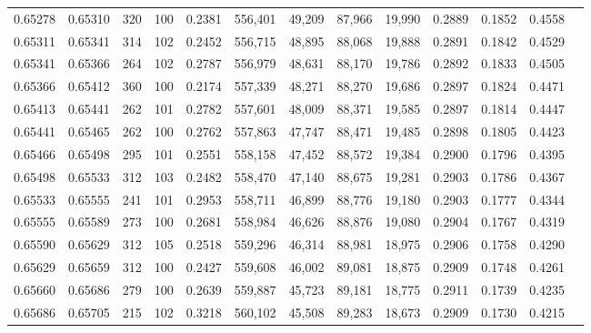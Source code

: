 \begin{tabular}{rrrrrrrrrrrrr}
0.65278 & 0.65310 &   320 & 100 &                                     0.2381 & 556,401 &  49,209 &  87,966 &  19,990 & 0.2889 & 0.1852 & 0.4558 \\
0.65311 & 0.65341 &   314 & 102 &                                     0.2452 & 556,715 &  48,895 &  88,068 &  19,888 & 0.2891 & 0.1842 & 0.4529 \\
0.65341 & 0.65366 &   264 & 102 &                                     0.2787 & 556,979 &  48,631 &  88,170 &  19,786 & 0.2892 & 0.1833 & 0.4505 \\
0.65366 & 0.65412 &   360 & 100 &                                     0.2174 & 557,339 &  48,271 &  88,270 &  19,686 & 0.2897 & 0.1824 & 0.4471 \\
0.65413 & 0.65441 &   262 & 101 &                                     0.2782 & 557,601 &  48,009 &  88,371 &  19,585 & 0.2897 & 0.1814 & 0.4447 \\
0.65441 & 0.65465 &   262 & 100 &                                     0.2762 & 557,863 &  47,747 &  88,471 &  19,485 & 0.2898 & 0.1805 & 0.4423 \\
0.65466 & 0.65498 &   295 & 101 &                                     0.2551 & 558,158 &  47,452 &  88,572 &  19,384 & 0.2900 & 0.1796 & 0.4395 \\
0.65498 & 0.65533 &   312 & 103 &                                     0.2482 & 558,470 &  47,140 &  88,675 &  19,281 & 0.2903 & 0.1786 & 0.4367 \\
0.65533 & 0.65555 &   241 & 101 &                                     0.2953 & 558,711 &  46,899 &  88,776 &  19,180 & 0.2903 & 0.1777 & 0.4344 \\
0.65555 & 0.65589 &   273 & 100 &                                     0.2681 & 558,984 &  46,626 &  88,876 &  19,080 & 0.2904 & 0.1767 & 0.4319 \\
0.65590 & 0.65629 &   312 & 105 &                                     0.2518 & 559,296 &  46,314 &  88,981 &  18,975 & 0.2906 & 0.1758 & 0.4290 \\
0.65629 & 0.65659 &   312 & 100 &                                     0.2427 & 559,608 &  46,002 &  89,081 &  18,875 & 0.2909 & 0.1748 & 0.4261 \\
0.65660 & 0.65686 &   279 & 100 &                                     0.2639 & 559,887 &  45,723 &  89,181 &  18,775 & 0.2911 & 0.1739 & 0.4235 \\
0.65686 & 0.65705 &   215 & 102 &                                     0.3218 & 560,102 &  45,508 &  89,283 &  18,673 & 0.2909 & 0.1730 & 0.4215 \\

\end{tabular}
